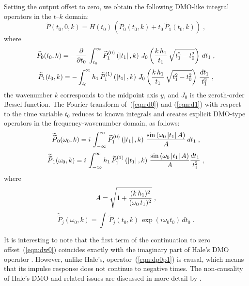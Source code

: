 Setting the output offset to zero, we obtain the following DMO-like
integral operators in the $t$--$k$ domain:
\begin{equation}
\widetilde{P}(t_0,0,k)=
H(t_0)\,\left(\widetilde{P}_0(t_0,k) +
t_0\,\widetilde{P}_1(t_0,k)\right)\;,
\label{eqn:dp0p1} 
\end{equation}
where
\begin{equation}
\widetilde{P}_0(t_0,k)  = 
- {\partial \over {\partial t_0}}\,
\int_{t_0}^{\infty}
\widetilde{P}^{(0)}_1\left(\left|t_1\right|,k\right)\,
J_0\left({{k\,h_1}\over t_1}\,
\sqrt{t_1^2-t_0^2}\right)\,dt_1\;,
\label{eqn:d0} 
\end{equation}
\begin{equation}
\widetilde{P}_1(t_0,k)  = 
- \int_{t_0}^{\infty}
h_1\,\widetilde{P}^{(1)}_1\left(\left|t_1\right|,k\right)\,
J_0\left({{k\,h_1}\over t_1}\,
\sqrt{t_1^2-t_0^2}\right)\,{dt_1 \over t_1^2}\;,
\label{eqn:d1} 
\end{equation}
the wavenumber $k$ corresponds to the midpoint axis $y$, and $J_0$ is
the zeroth-order Bessel function.  The Fourier transform
of~(\ref{eqn:d0}) and (\ref{eqn:d1}) with respect to the time variable
$t_0$ reduces to known integrals \cite[]{table} and creates explicit
DMO-type operators in the frequency-wavenumber domain, as follows:
\begin{equation}
\widetilde{\widetilde{P}}_0(\omega_0,k)  = 
i\,
\int_{-\infty}^{\infty}
\widetilde{P}^{(0)}_1\left(\left|t_1\right|,k\right)\,
{\sin{\left(\omega_0\,|t_1|\,A\right)} \over A}
\,dt_1\;,
\label{eqn:dw0} 
\end{equation}
\begin{equation}
\widetilde{\widetilde{P}}_1(\omega_0,k)  = 
i\, \int_{-\infty}^{\infty}
h_1\,\widetilde{P}^{(1)}_1\left(\left|t_1\right|,k\right)\,
{\sin{\left(\omega_0\,|t_1|\,A\right)} \over A}
{dt_1 \over t_1^2}\;,
\label{eqn:dw1} 
\end{equation}
where 
\begin{equation}
A=\sqrt{1+{(k\,h_1)^2 \over (\omega_0\,t_1)^2}}\;,
\label{eqn:a} 
\end{equation}
\begin{equation}
\widetilde{\widetilde{P}}_j(\omega_0,k)=
\int\,\widetilde{P}_j(t_0,k)\,\exp (i\omega_0 t_0)\,dt_0\;.
\label{eqn:FFT} 
\end{equation}

It is interesting to note that the first term of the continuation to
zero offset~(\ref{eqn:dw0}) coincides exactly with the imaginary part
of Hale's DMO operator \cite[]{GEO49-06-07410757}. However, unlike Hale's,
operator~(\ref{eqn:dp0p1}) is causal, which means that its impulse
response does not continue to negative times. The non-causality of
Hale's DMO and related issues are discussed in more detail by
\cite{stovas}.

